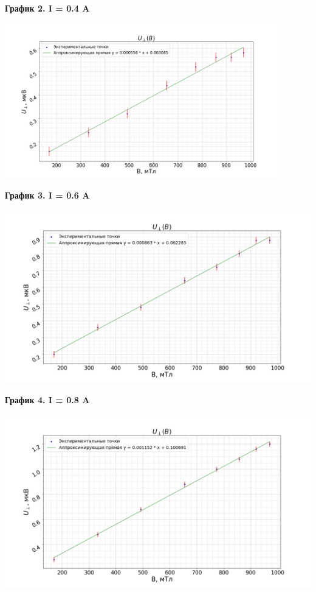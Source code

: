 \documentclass[15pt,a5paper,reqno]{article}
\begin{document}
    \noindent\hypertarget{graph_2}{\textbf{График 2. I = 0.4 A}}
    \begin{center}
        \includegraphics[width = 0.9\textwidth]{images/graph_2.png}
    \end{center}

    \noindent\hypertarget{graph_3}{\textbf{График 3. I = 0.6 A}}
    \begin{center}
        \includegraphics[width = \textwidth]{images/graph_3.png}
    \end{center}

    \noindent\hypertarget{graph_4}{\textbf{График 4. I = 0.8 A}}
    \begin{center}
        \includegraphics[width = \textwidth]{images/graph_4.png}
    \end{center}
\end{document}
